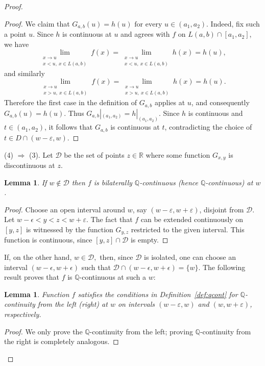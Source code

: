 \documentclass[11pt]{amsart} %
\newtheorem{lemma}[theorem]{Lemma}
\theoremstyle{definition}
\newcommand{\R}{\mathbb{R}}
\newcommand{\Q}{\mathbb{Q}}
\begin{document}
\begin{proof}
\begin{proof}
We claim that $
G_{a,b}(u)=h(u)
\text{ for every }u\in(a_1,a_2).$
Indeed, fix such a point $u$. Since $h$ is continuous at $u$ and agrees with
$f$ on $L(a,b)\cap[a_1,a_2]$, we have
\begin{equation} 
\lim_{\substack{x\to u\\x<u,\ x\in L(a,b)}} f(x)
=
\lim_{\substack{x\to u\\x<u,\ x\in L(a,b)}} h(x)
=
h(u),
\end{equation} 
and similarly
\begin{equation} 
\lim_{\substack{x\to u\\x>u,\ x\in L(a,b)}} f(x)
=
\lim_{\substack{x\to u\\x>u,\ x\in L(a,b)}} h(x)
=
h(u).
\end{equation} 
Therefore the first case in the definition of $G_{a,b}$ applies at
$u$, and consequently $G_{a,b}(u)=h(u).$ Thus $
G_{a,b}|_{(a_1,a_2)}=h|_{(a_1,a_2)}.$
Since $h$ is continuous and $t\in(a_1,a_2)$, it follows that
$G_{a,b}$ is continuous at $t$, contradicting the choice of $t\in 
D\cap(w-\varepsilon,w)$. 
\end{proof}



(4) $\Rightarrow$ (3). Let $\mathcal{D}$ be the set of points $z\in \R$ where some function $G_{x,y}$ is discontinuous at $z$. 

\begin{lemma} 
If $w\notin\mathcal{D}$ then $f$ is bilaterally $\mathbb{Q}$-continuous (hence $\Q$-continuous) at $w$. 
\end{lemma}  
\begin{proof}
Choose an open interval around
$w$, say $(w-\varepsilon,w+\varepsilon)$, disjoint from $\mathcal{D}$. Let $w-\epsilon<y<z<w+\varepsilon$. The fact that $f$ can
be extended continuously on $[y, z]$ is witnessed by the function $G_{y,z}$ restricted
to the given interval. This function is continuous, since $[y,z]\cap\mathcal{D}$ is empty. 
\end{proof} 

If, on the other hand, $w\in\mathcal{D},$ then, since $\mathcal{D}$ is isolated, one can choose an
interval $(w-\epsilon,w+\epsilon)$ such that $\mathcal{D}\cap(w-\epsilon,w+\epsilon)=\{w\}$. The following result proves that $f$ is $\Q$-continuous at such a $w$: 

\begin{lemma} 
Function $f$ satisfies the conditions in Definition~\ref{def:qcont} for $\Q$-continuity from the left (right) at $w$ on intervals $(w-\varepsilon,w)$ and $(w,w+\varepsilon)$, respectively. 
\end{lemma}
\begin{proof} 
We only prove the $\Q$-continuity from the left; proving $\Q$-continuity from the right is completely analogous. 


\end{proof}
\end{proof}
\end{document}
